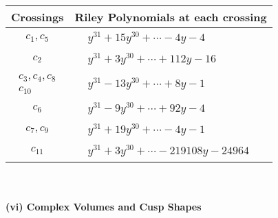 \documentclass[1p]{elsarticle_modified}
\theoremstyle{definition}
\begin{document}
\begin{tabular}{m{50pt}|m{274pt}}
Crossings & \hspace{64pt}Riley Polynomials at each crossing \\
\hline $$\begin{aligned}c_{1},c_{5}\end{aligned}$$&$\begin{aligned}
&y^{31}+15 y^{30}+\cdots-4 y-4
\end{aligned}$\\
\hline $$\begin{aligned}c_{2}\end{aligned}$$&$\begin{aligned}
&y^{31}+3 y^{30}+\cdots+112 y-16
\end{aligned}$\\
\hline $$\begin{aligned}c_{3},c_{4},c_{8}\\c_{10}\end{aligned}$$&$\begin{aligned}
&y^{31}-13 y^{30}+\cdots+8 y-1
\end{aligned}$\\
\hline $$\begin{aligned}c_{6}\end{aligned}$$&$\begin{aligned}
&y^{31}-9 y^{30}+\cdots+92 y-4
\end{aligned}$\\
\hline $$\begin{aligned}c_{7},c_{9}\end{aligned}$$&$\begin{aligned}
&y^{31}+19 y^{30}+\cdots-4 y-1
\end{aligned}$\\
\hline $$\begin{aligned}c_{11}\end{aligned}$$&$\begin{aligned}
&y^{31}+3 y^{30}+\cdots-219108 y-24964
\end{aligned}$\\
\hline
\end{tabular}\\~\\
\newpage\flushleft \textbf{(vi) Complex Volumes and Cusp Shapes}
\end{document}
